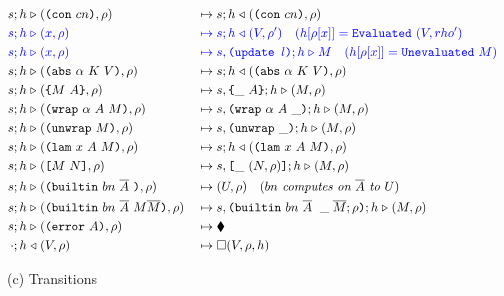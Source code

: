 \vfill
\newpage
\begin{figure*}[!ht]\ContinuedFloat
\hspace{-2cm}\begin{subfigure}[c]{\linewidth}   %
{
\small
\caption*{\hspace{3cm}(c) Transitions}
\begin{alignat*}{2}\\
      s;h  &\compute  (\con{cn}, \rho)              &{}\mapsto{}& s;h \return (\con{cn}, \rho)\\
      \blue{s;h} &\bcompute \blue{(x, \rho)}        &{}\bmapsto{}& \blue{s;h \return (V,\rho^{\prime})  \quad (h[\rho[x]] = \texttt{Evaluated}\ (V, rho^{\prime})}\\  %
      \blue{s;h} &\bcompute \blue{(x, \rho)}        &{}\bmapsto{}& \blue{s,\texttt{(update\ $l$)}; h \compute M \quad (h[\rho[x]] = \texttt{Unevaluated}\ M)}\\  %
      s;h &\compute (\abs{\alpha}{K}{V}, \rho)      &{}\mapsto{}& s;h \return (\abs{\alpha}{K}{V}, \rho)\\
      s;h &\compute (\inst{M}{A}, \rho)             &{}\mapsto{}& s,\inInstLeftFrame{A}; h \compute (M,\rho)\\
      s;h &\compute (\wrap{\alpha}{A}{M}, \rho)     &{}\mapsto{}& s,\inWrapRightFrame{\alpha}{A};h \compute (M, \rho)\\
      s;h &\compute (\unwrap{M}, \rho)              &{}\mapsto{}& s, \inUnwrapFrame{};h \compute (M,\rho)\\
      s;h &\compute (\lam{x}{A}{M}, \rho)           &{}\mapsto{}& s;h \return (\lam{x}{A}{M}, \rho)\\
      s;h &\compute (\app{M}{N}, \rho)              &{}\mapsto{}& s,\inAppLeftFrame{(N, \rho)};h \compute (M,\rho)\\
      s;h &\compute (\builtin{bn}{\repetition{A}}{}, \rho) 
                                                    &{}\mapsto{}& (U,\rho) \quad (\textit{$bn$ computes on $\repetition{A}$ to $U$})\\
      s;h &\compute (\builtin{bn}{\repetition{A}}{M \repetition{M}}, \rho) 
                                                    &{}\mapsto{}& s,\inBuiltin{bn}{\repetition{A}}{}{\_}{\repetition{M}; \rho};h \compute (M, \rho)\\
      s;h &\compute (\error{A}, \rho) &{}\mapsto{}& \ckerror{}\\
      \cdot;h &\return (V, \rho) &{}\mapsto{}& \square(V, \rho, h)\\

\end{alignat*}}
\end{subfigure}
\end{figure*}
